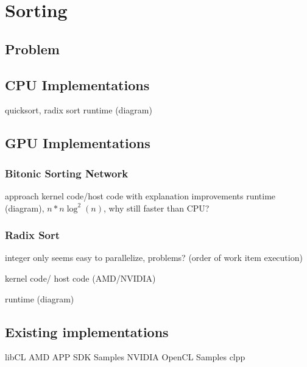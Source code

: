 \section{Sorting}
\label{sec:sorting}

\subsection{Problem}

\subsection{CPU Implementations}
quicksort, radix sort
runtime (diagram)

\subsection{GPU Implementations}

\subsubsection{Bitonic Sorting Network}
approach
kernel code/host code with explanation
improvements
runtime (diagram), $n * n \log^2(n)$, why still faster than CPU?

\subsubsection{Radix Sort}
\label{sec:sorting_radix}
integer only
seems easy to parallelize, problems? (order of work item execution)

kernel code/ host code (AMD/NVIDIA)

runtime (diagram)

\subsection{Existing implementations}
libCL
AMD APP SDK Samples
NVIDIA OpenCL Samples
clpp
